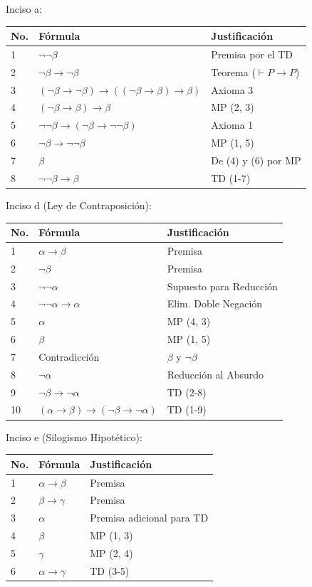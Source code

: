 \documentclass[fc]{tarea}
\begin{document}
\begin{solution}
Inciso a:
\smallskip

\begin{tabular}{l|l|l}
No. & Fórmula & Justificación \\
\hline
1 & $\neg \neg \beta$ & Premisa por el TD \\
2 & $\neg \beta \rightarrow \neg \beta$ & Teorema ($\vdash P \rightarrow P$) \\
3 & $(\neg \beta \rightarrow \neg \beta) \rightarrow ((\neg \beta \rightarrow \beta) \rightarrow \beta)$ & Axioma 3 \\
4 & $(\neg \beta \rightarrow \beta) \rightarrow \beta$ & MP (2, 3) \\
5 & $\neg \neg \beta \rightarrow (\neg \beta \rightarrow \neg \neg \beta)$ & Axioma 1 \\
6 & $\neg \beta \rightarrow \neg \neg \beta$ & MP (1, 5) \\
7 & $\beta$ & De (4) y (6) por MP \\
\hline
8 & $\neg \neg \beta \rightarrow \beta$ & TD (1-7)
\end{tabular}

\bigskip

Inciso d (Ley de Contraposición):
\smallskip

\begin{tabular}{l|l|l}
No. & Fórmula & Justificación \\
\hline
1 & $\alpha \rightarrow \beta$ & Premisa \\
2 & $\neg \beta$ & Premisa \\
3 & $\neg \neg \alpha$ & Supuesto para Reducción \\
4 & $\neg \neg \alpha \rightarrow \alpha$ & Elim. Doble Negación \\
5 & $\alpha$ & MP (4, 3) \\
6 & $\beta$ & MP (1, 5) \\
7 & Contradicción & $\beta$ y $\neg \beta$ \\
\hline
8 & $\neg \alpha$ & Reducción al Absurdo \\
9 & $\neg \beta \rightarrow \neg \alpha$ & TD (2-8) \\
10 & $(\alpha \rightarrow \beta) \rightarrow (\neg \beta \rightarrow \neg \alpha)$ & TD (1-9)
\end{tabular}

\bigskip

Inciso e (Silogismo Hipotético):
\smallskip

\begin{tabular}{l|l|l}
No. & Fórmula & Justificación \\
\hline
1 & $\alpha \rightarrow \beta$ & Premisa \\
2 & $\beta \rightarrow \gamma$ & Premisa \\
3 & $\alpha$ & Premisa adicional para TD \\
4 & $\beta$ & MP (1, 3) \\
5 & $\gamma$ & MP (2, 4) \\
\hline
6 & $\alpha \rightarrow \gamma$ & TD (3-5)
\end{tabular}
\end{solution}
\end{document}
